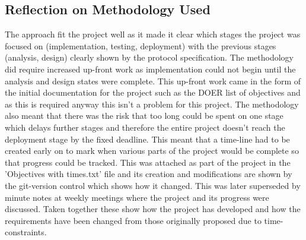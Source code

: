 \documentclass[11pt,a4paper]{article}
\begin{document}
\subsection{Reflection on Methodology Used}
The approach fit the project well as it made it clear which stages the project was focused on (implementation, testing, deployment) with the previous stages (analysis, design) clearly shown by the protocol specification. The methodology did require increased up-front work as implementation could not begin until the analysis and design states were complete. This up-front work came in the form of the initial documentation for the project such as the DOER list of objectives and as this is required anyway this isn't a problem for this project. The methodology also meant that there was the risk that too long could be spent on one stage which delays further stages and therefore the entire project doesn't reach the deployment stage by the fixed deadline. This meant that a time-line had to be created early on to mark when various parts of the project would be complete so that progress could be tracked. This was attached as part of the project in the 'Objectives with times.txt' file and its creation and modifications are shown by the git-version control which shows how it changed. This was later superseded by minute notes at weekly meetings where the project and its progress were discussed. Taken together these show how the project has developed and how the requirements have been changed from those originally proposed due to time-constraints. \\
\end{document}

